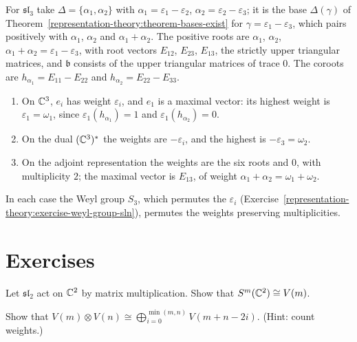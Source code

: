 \begin{example}\label{representation-theory:example-sl3-weights}
For $\mathfrak{sl}_3$ take $\Delta = \{\alpha_1, \alpha_2\}$ with $\alpha_1 = \varepsilon_1 - \varepsilon_2$, $\alpha_2 = \varepsilon_2 - \varepsilon_3$; it is the base $\Delta(\gamma)$ of
Theorem~\ref{representation-theory:theorem-bases-exist} for $\gamma = \varepsilon_1 - \varepsilon_3$, which pairs positively with $\alpha_1$, $\alpha_2$ and $\alpha_1 + \alpha_2$. The positive roots are $\alpha_1$, $\alpha_2$,
$\alpha_1 + \alpha_2 = \varepsilon_1 - \varepsilon_3$, with root vectors $E_{12}$, $E_{23}$, $E_{13}$, the strictly upper triangular matrices, and $\mathfrak{b}$ consists of the upper
triangular matrices of trace $0$. The coroots are $h_{\alpha_1} = E_{11} - E_{22}$ and $h_{\alpha_2} = E_{22} - E_{33}$.
\begin{enumerate}
\item On $\mathbb{C}^3$, $e_i$ has weight $\varepsilon_i$, and $e_1$ is a maximal vector: its highest weight is $\varepsilon_1 = \omega_1$, since $\varepsilon_1(h_{\alpha_1}) = 1$ and
$\varepsilon_1(h_{\alpha_2}) = 0$.
\item On the dual $(\mathbb{C}^3)^*$ the weights are $-\varepsilon_i$, and the highest is $-\varepsilon_3 = \omega_2$.
\item On the adjoint representation the weights are the six roots and $0$, with multiplicity $2$; the maximal vector is $E_{13}$, of weight $\alpha_1 + \alpha_2 = \omega_1 + \omega_2$.
\end{enumerate}
In each case the Weyl group $S_3$, which permutes the $\varepsilon_i$ (Exercise~\ref{representation-theory:exercise-weyl-group-sln}), permutes the weights preserving multiplicities.
\end{example}
\section{Exercises}\label{representation-theory:section-exercises}

\begin{exercise}\label{representation-theory:exercise-symmetric-powers}
Let $\mathfrak{sl}_2$ act on $\mathbb{C}^2$ by matrix multiplication. Show that $S^m(\mathbb{C}^2) \cong V(m)$.
\end{exercise}

\begin{exercise}\label{representation-theory:exercise-clebsch-gordan}
Show that $V(m) \otimes V(n) \cong \bigoplus_{i=0}^{\min(m,n)} V(m + n - 2i)$. (Hint: count weights.)
\end{exercise}

